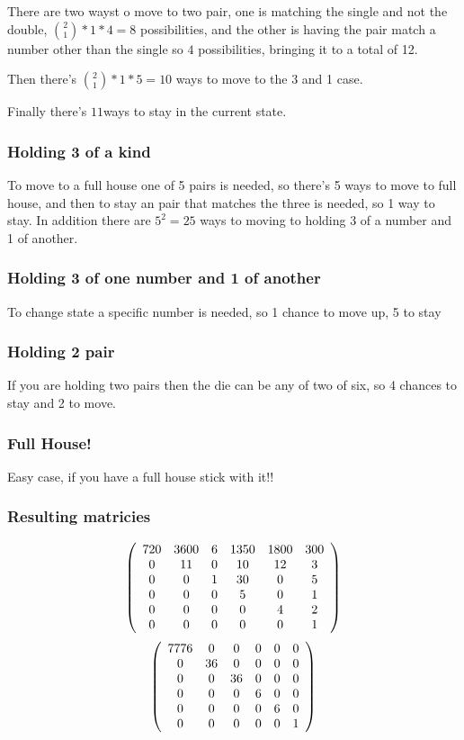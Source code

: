There are two wayst o move to two pair, one is matching the single and not the double, ${2 \choose 1} * 1 * 4 = 8$ possibilities, and the other is having the pair match a number other than the single so $ 4 $ possibilities, bringing it to a total of 12. 

Then there's ${2 \choose 1} *1 * 5= 10$ ways to move to the 3 and 1 case.

Finally there's $ 11$ways to stay  in the current state.
\subsubsection{Holding 3 of a kind}
To move to a full house one of 5 pairs is needed, so there's 5 ways to move to full house, and then to stay an pair that matches the three is needed, so 1 way to stay. In addition there are $5^2=25$ ways to moving to holding 3 of a number and 1 of another. 
\subsubsection{Holding 3 of one number and 1 of another}
To change state a specific number is needed, so 1 chance to move up, 5  to stay
\subsubsection{Holding 2 pair}
If you are holding two pairs then the die can be any of two of six, so 4 chances to stay and 2 to move.
\subsubsection{Full House!}
Easy case, if you have a full house stick with it!!

\subsubsection{Resulting matricies}
\[
\left(
\begin{array}{c c c c c c}
720 & 3600 & 6 & 1350 & 1800 & 300\\
0 & 11 & 0 & 10 & 12 & 3\\
0 & 0 & 1 & 30 & 0 & 5\\
0 & 0 & 0 & 5 & 0 & 1\\
0 & 0 & 0 & 0 & 4 & 2\\
0 & 0 & 0 & 0 & 0 & 1\\
\end{array}
\right)
\]
\[
\left(
\begin{array}{c c c c c c}

7776&0	& 0 	& 0		&0	&0\\
0	&36	& 0 	& 0		&0	&0\\
0 	&0	& 36	& 0		&0	&0\\
0 	&0	& 0		& 6		&0	&0\\
0 	&0	& 0		& 0		&6	&0\\
0 	&0	& 0		& 0		&0	&1
\end{array}
\right)
\]
